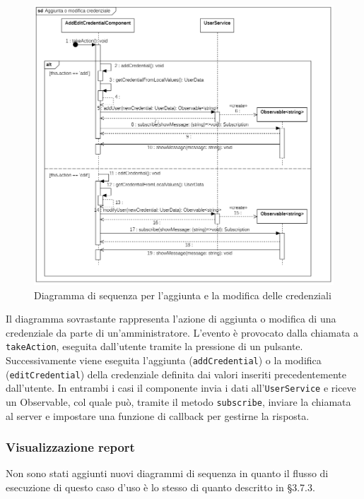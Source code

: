 \begin{figure}[H]
	\centering
	\includegraphics[width=18cm]{res/images/webapp-credenzialiAddEdit-diagrammaSequenza.png}
	\caption{Diagramma di sequenza per l'aggiunta e la modifica delle credenziali}
	\label{fig:DiagrammaSequenzaVisualizzazioneCredenziali}
\end{figure}
Il diagramma sovrastante rappresenta l'azione di aggiunta o modifica di una credenziale da parte di un'amministratore. L'evento è provocato dalla chiamata a \texttt{takeAction}, eseguita dall'utente tramite la pressione di un pulsante. Successivamente viene eseguita l'aggiunta (\texttt{addCredential}) o la modifica (\texttt{editCredential}) della credenziale definita dai valori inseriti precedentemente dall'utente. In entrambi i casi il componente invia i dati all'\texttt{UserService} e riceve un Observable, col quale può, tramite il metodo \texttt{subscribe}, inviare la chiamata al server e impostare una funzione di callback per gestirne la risposta.

\subsubsection{Visualizzazione report}

Non sono stati aggiunti nuovi diagrammi di sequenza in quanto il flusso di esecuzione di questo caso d'uso è lo stesso di quanto descritto in §3.7.3.



